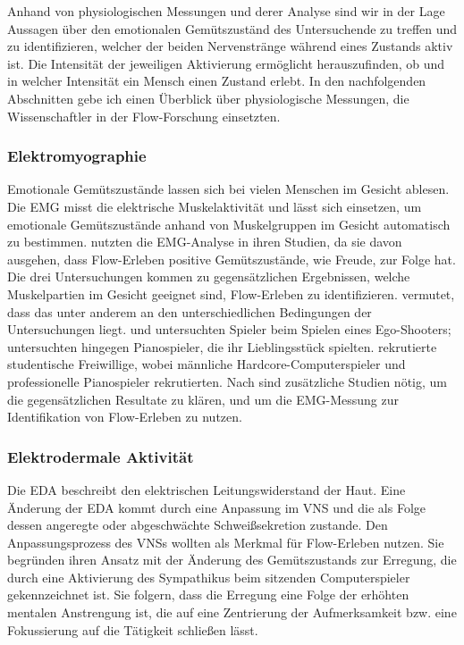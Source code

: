 Anhand von physiologischen Messungen und derer Analyse sind wir in der Lage Aussagen über den emotionalen Gemütszuständ des Untersuchende zu treffen und zu identifizieren, welcher der beiden Nervenstränge während eines Zustands aktiv ist. Die Intensität der jeweiligen Aktivierung ermöglicht herauszufinden, ob und in welcher Intensität ein Mensch einen Zustand erlebt. In den nachfolgenden Abschnitten gebe ich einen Überblick über physiologische Messungen, die Wissenschaftler in der Flow-Forschung einsetzten.

\subsubsection{Elektromyographie} 

\label{ssub:elektromyographie}

Emotionale Gemütszustände lassen sich bei vielen Menschen im Gesicht ablesen. Die \ac{EMG} misst die elektrische Muskelaktivität und lässt sich einsetzen, um emotionale Gemütszustände anhand von Muskelgruppen im Gesicht automatisch zu bestimmen. \citet{Kivikangas2006, Nacke2008, deManzano2010} nutzten die \ac{EMG}-Analyse in ihren Studien, da sie davon ausgehen, dass Flow-Erleben positive Gemütszustände, wie Freude, zur Folge hat. Die drei Untersuchungen kommen zu gegensätzlichen Ergebnissen, welche Muskelpartien im Gesicht geeignet sind, Flow-Erleben zu identifizieren. \citet[][S.~153]{Peifer2012} vermutet, dass das unter anderem an den unterschiedlichen Bedingungen der Untersuchungen liegt. \citet{Kivikangas2006} und \citet{Nacke2008} untersuchten Spieler beim Spielen eines Ego-Shooters; \citet{deManzano2010} untersuchten hingegen Pianospieler, die ihr Lieblingsstück spielten. \citet{Kivikangas2006} rekrutierte studentische Freiwillige, wobei \citet{Nacke2008} männliche Hardcore-Computerspieler und \citet{deManzano2010} professionelle Pianospieler rekrutierten. Nach \citet[][S.~153]{Peifer2012} sind zusätzliche Studien nötig, um die gegensätzlichen Resultate zu klären, und um die \ac{EMG}-Messung zur Identifikation von Flow-Erleben zu nutzen.

\subsubsection{Elektrodermale Aktivität} 

\label{ssub:elektrodermale_aktivitat}

Die \ac{EDA} beschreibt den elektrischen Leitungswiderstand der Haut. Eine Änderung der \ac{EDA} kommt durch eine Anpassung im \ac{VNS} und die als Folge dessen angeregte oder abgeschwächte Schweißsekretion zustande. Den Anpassungsprozess des \ac{VNS}s wollten \citet{Kivikangas2006, Nacke2008} als Merkmal für Flow-Erleben nutzen. Sie begründen ihren Ansatz mit der Änderung des Gemütszustands zur Erregung, die durch eine Aktivierung des Sympathikus beim sitzenden Computerspieler gekennzeichnet ist. Sie folgern, dass die Erregung eine Folge der erhöhten mentalen Anstrengung ist, die auf eine Zentrierung der Aufmerksamkeit bzw. eine Fokussierung auf die Tätigkeit schließen lässt.

